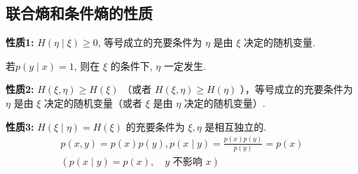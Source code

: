 \subsection{联合熵和条件熵的性质}

\textbf{性质1:} $ H(\eta \mid \xi) \geqslant 0 $, 等号成立的充要条件为 $ \eta $ 是由 $ \xi $ 决定的随机变量.

\begin{remark}
    若$ p(y \mid x)=1 $, 则在 $ \xi $ 的条件下, $ \eta $ 一定发生.
\end{remark}


\textbf{性质2:} $ H(\xi, \eta) \geqslant H(\xi) $ （或者 $ H(\xi, \eta) \geqslant H(\eta) $ ），等号成立的充要条件为 $ \eta $ 是由 $ \xi $ 决定的随机变量（或者 $ \xi $ 是由 $ \eta $ 决定的随机变量）.

\textbf{性质3:} $ H(\xi \mid \eta)=H(\xi) $ 的充要条件为 $ \xi, \eta $ 是相互独立的.
$$
\begin{array}{c}
p(x, y)=p(x) p(y), p(x \mid y)=\frac{p(x) p(y)}{p(y)}=p(x) \\
\left(p(x \mid y)=p(x), \quad y \text { 不影响 } x \right)
\end{array}
$$

